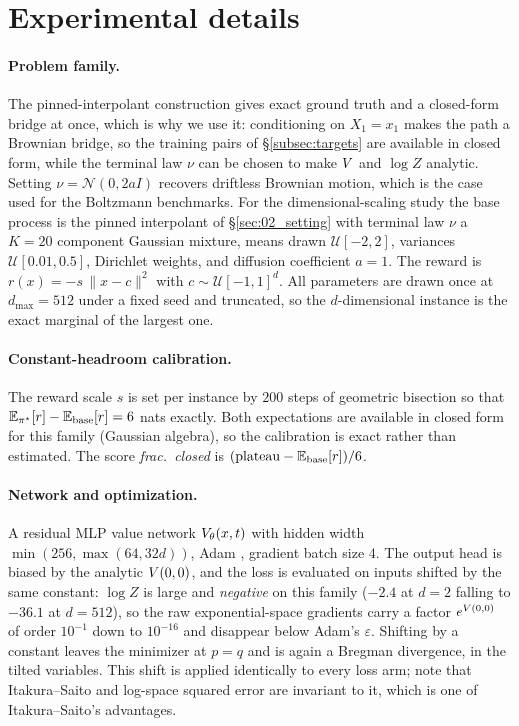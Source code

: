 \section{Experimental details}
\label{sec:C_experimental_details}

\paragraph{Problem family.}
The pinned-interpolant construction gives exact ground truth and a closed-form
bridge at once, which is why we use it: conditioning on $X_1=x_1$ makes the
path a Brownian bridge, so the training pairs of \S\ref{subsec:targets} are
available in closed form, while the terminal law $\nu$ can be chosen to make
$V$ and $\log Z$ analytic. Setting $\nu=\mathcal{N}(0,2aI)$ recovers
driftless Brownian motion, which is the case used for the Boltzmann
benchmarks. For the dimensional-scaling study the base process is the pinned
interpolant of \S\ref{sec:02_setting} with
terminal law $\nu$ a $K=20$ component Gaussian mixture, means drawn
$\mathcal{U}[-2,2]$, variances $\mathcal{U}[0.01,0.5]$, Dirichlet weights, and
diffusion coefficient $a=1$. The reward is
$r(x)=-s\,\|x-c\|^{2}$ with $c\sim\mathcal{U}[-1,1]^{d}$. All parameters are
drawn once at $d_{\max}=512$ under a fixed seed and truncated, so the
$d$-dimensional instance is the exact marginal of the largest one.

\paragraph{Constant-headroom calibration.}
The reward scale $s$ is set per instance by $200$ steps of geometric bisection
so that $\mathbb{E}_{\pi^\star}[r]-\mathbb{E}_{\mathrm{base}}[r]=6$ nats exactly. Both expectations are
available in closed form for this family (Gaussian algebra), so the calibration
is exact rather than estimated. The score \emph{frac.\ closed} is
$(\text{plateau}-\mathbb{E}_{\mathrm{base}}[r])/6$.

\paragraph{Network and optimization.}
A residual MLP value network $V_\theta(x,t)$ with hidden width
$\min(256,\max(64,32d))$, Adam \citep{kingma2015adam}, gradient batch size $4$. The output head is
biased by the analytic $V(0,0)$, and the loss is evaluated on inputs shifted
by the same constant: $\log Z$ is large and \emph{negative} on this family
($-2.4$ at $d=2$ falling to $-36.1$ at $d=512$), so the raw exponential-space
gradients carry a factor $e^{V(0,0)}$ of order $10^{-1}$ down to $10^{-16}$
and disappear below Adam's $\varepsilon$. Shifting by a constant leaves the minimizer at $p=q$ and is
again a Bregman divergence, in the tilted variables. This shift is applied
identically to every loss arm; note that Itakura--Saito and log-space squared
error are invariant to it, which is one of Itakura--Saito's advantages.

